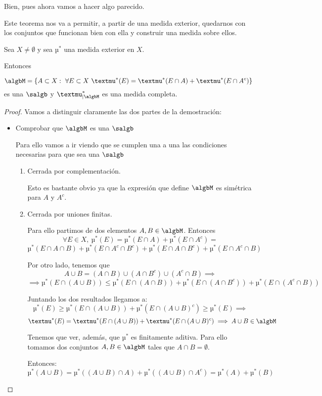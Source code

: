 \documentclass{apuntes}
\begin{document}
Bien, pues ahora vamos a hacer algo parecido.
\begin{theorem}
Este teorema nos va a permitir, a partir de una medida exterior, quedarnos con los conjuntos que funcionan bien con ella y construir una medida sobre ellos.

Sea $X \neq \emptyset$ y sea $µ^*$ una medida exterior en $X$.

Entonces

\[\algbM = \{A \subset X: \ \forall E \subset X \ µ^*(E)=µ^*(E \cap A) + µ^*(E \cap A^c)\}\]
es una $\salgb$ y $µ^*_{|\algbM}$ es una medida completa.
\end{theorem}
\begin{proof}
Vamos a distinguir claramente las dos partes de la demostración:
\begin{itemize}
\item Comprobar que $\algbM$ es una $\salgb$

Para ello vamos a ir viendo que se cumplen una a una las condiciones necesarias para que sea una $\salgb$
\begin{enumerate}
\item Cerrada por complementación.

Esto es bastante obvio ya que la expresión que define $\algbM$ es simétrica para $A$ y $A^c$.

\item Cerrada por uniones finitas.

Para ello partimos de dos elementos $A,B\in \algbM$. Entonces
\[\forall E \in X, \ µ^*(E)=µ^*(E \cap A)+µ^*(E \cap A^c) = \]
\[µ^*(E \cap A\cap B)+µ^*(E \cap A^c \cap B^c)+µ^*(E \cap A \cap B^c)+µ^*(E \cap A^c \cap B)\]

Por otro lado, tenemos que
\[A \cup B = (A\cap B)\cup(A\cap B^c)\cup (A^c \cap B) \implies\]
\[\implies µ^*(E\cap (A\cup B)) \leq µ^*(E \cap (A \cap B))+µ^*(E \cap (A \cap B^c))+µ^*(E \cap (A^c \cap B))\]

Juntando los dos resultados llegamos a:
\[µ^*(E) \geq µ^*(E \cap (A \cup B))+µ^*(E \cap (A \cup B)^c)\geq µ^*(E) \implies\]
\[µ^*(E) = µ^*(E \cap (A \cup B))+µ^*(E \cap (A \cup B)^c) \implies  A \cup B \in \algbM\]


Tenemos que ver, además, que $µ^*$ es finitamente aditiva. Para ello tomamos dos conjuntos $A, B \in \algbM$ tales que $A \cap B = \emptyset$.

Entonces:
\[µ^*(A \cup B) = µ^*((A \cup B) \cap A) + µ^*((A \cup B) \cap A^c)= µ^*(A)+µ^*(B)\]


\end{enumerate}
\end{itemize}
\end{proof}
\end{document}
